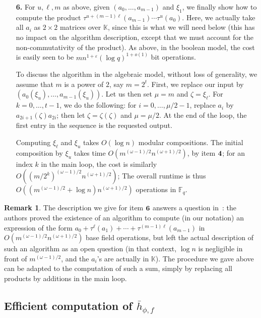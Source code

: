 \documentclass[12pt]{article}
\theoremstyle{definition}
\newtheorem{remark}{Remark}
\def\F{\ensuremath{\mathbb{F}}}
\def\K{\ensuremath{\mathbb{K}}}
\begin{document}
\begin{enumerate}
\item [{\bf 6.}] For $u,\ell,m$ as above, given $(a_0,\dots,a_{m-1})$
  and $\xi_1$, we finally show how to compute the product
  $\tau^{u+(m-1)\ell}(a_{m-1}) \cdots \tau^{u}(a_0).$ Here, we
  actually take all $a_i$ as $2\times 2$ matrices over $\K$, since
  this is what we will need below (this has no impact on the algorithm
  description, except that we must account for the non-commutativity
  of the product). As above, in the boolean model, the cost is easily
  seen to be $m n^{1+\varepsilon} (\log q)^{1+o(1)}$ bit operations.
  
  To discuss the algorithm in the algebraic model, without loss of
  generality, we assume that $m$ is a power of $2$, say
  $m=2^t$. First, we replace our input by
  $(a_0(\xi_u),\dots,a_{m-1}(\xi_u))$. Let us then set $\mu=m$ and
  $\zeta=\xi_\ell$.  For $k=0,\dots,t-1$, we do the following: for
  $i=0,\dots,\mu/2-1$, replace $a_i$ by $a_{2i+1}(\zeta) a_{2i}$; then
  let $\zeta=\zeta(\zeta)$ and $\mu=\mu/2$.  At the end of the loop,
  the first entry in the sequence is the requested output.

  Computing $\xi_\ell$ and $\xi_u$ takes $O(\log n)$ modular
  compositions.  The initial composition by $\xi_u$ takes time
  $O(m^{(\omega-1)/2}n^{(\omega+1)/2})$, by item ${\bf 4}$; for an
  index $k$ in the main loop, the cost is similarly
  $O((m/2^k)^{(\omega-1)/2}n^{(\omega+1)/2})$; The overall runtime is
  thus $O((m^{(\omega-1)/2}+\log n)n^{(\omega+1)/2})$
  operations in $\F_q$.
\end{enumerate}


\begin{remark}
  The description we give for item ${\bf 6}$ answers a question
  in~\cite[Section~3.2]{ks}: the authors proved the existence of an
  algorithm to compute (in our notation) an expression of the form
  $a_0 + \tau^\ell(a_1) + \cdots + \tau^{(m-1)\ell}(a_{m-1})$
in
  $O(m^{(\omega-1)/2}n^{(\omega+1)/2})$ base field operations, but left
  the actual description of such an algorithm as an open question
  (in that context, $\log n$ is negligible in front of $m^{(\omega-1)/2}$,
  and the $a_i$'s are actually in $\K$).
  The procedure we gave above can be adapted to the computation
  of such a sum, simply by replacing all products by additions 
  in the main loop.
\end{remark}


\subsection{Efficient computation of $\bar h_{\phi,f}$}
\end{document}

